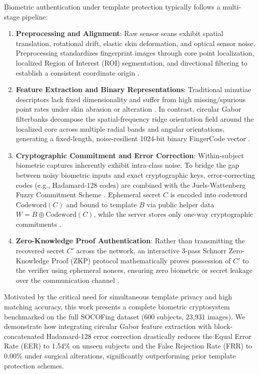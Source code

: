 \documentclass[conference]{IEEEtran}
\begin{document}
Biometric authentication under template protection typically follows a multi-stage pipeline:
\begin{enumerate}[itemsep=2pt, topsep=2pt]
    \item \textbf{Preprocessing and Alignment}: Raw sensor scans exhibit spatial translation, rotational drift, elastic skin deformation, and optical sensor noise. Preprocessing standardizes fingerprint images through core point localization, localized Region of Interest (ROI) segmentation, and directional filtering to establish a consistent coordinate origin \cite{daugman2004iris,ross2011visual}.
    
    \item \textbf{Feature Extraction and Binary Representations}: Traditional minutiae descriptors lack fixed dimensionality and suffer from high missing/spurious point rates under skin abrasion or alteration \cite{nandakumar2007vault}. In contrast, circular Gabor filterbanks decompose the spatial-frequency ridge orientation field around the localized core across multiple radial bands and angular orientations, generating a fixed-length, noise-resilient 1024-bit binary FingerCode vector \cite{daugman2004iris}.
    
    \item \textbf{Cryptographic Commitment and Error Correction}: Within-subject biometric captures inherently exhibit intra-class noise. To bridge the gap between noisy biometric inputs and exact cryptographic keys, error-correcting codes (e.g., Hadamard-128 codes) are combined with the Juels-Wattenberg Fuzzy Commitment Scheme \cite{juels1999fuzzy}. Ephemeral secret $C$ is encoded into codeword $\text{Codeword}(C)$ and bound to template $B$ via public helper data $W = B \oplus \text{Codeword}(C)$, while the server stores only one-way cryptographic commitments \cite{dodis2008fuzzy}.
    
    \item \textbf{Zero-Knowledge Proof Authentication}: Rather than transmitting the recovered secret $C'$ across the network, an interactive 3-pass Schnorr Zero-Knowledge Proof (ZKP) protocol \cite{schnorr1991efficient} mathematically proves possession of $C'$ to the verifier using ephemeral nonces, ensuring zero biometric or secret leakage over the communication channel \cite{goldwasser1989knowledge}.
\end{enumerate}

Motivated by the critical need for simultaneous template privacy and high matching accuracy, this work presents a complete biometric cryptosystem benchmarked on the full SOCOFing dataset (600 subjects, 23,931 images). We demonstrate how integrating circular Gabor feature extraction with block-concatenated Hadamard-128 error correction drastically reduces the Equal Error Rate (EER) to 1.54\% on unseen subjects and the False Rejection Rate (FRR) to 0.00\% under surgical alterations, significantly outperforming prior template protection schemes.
\end{document}
